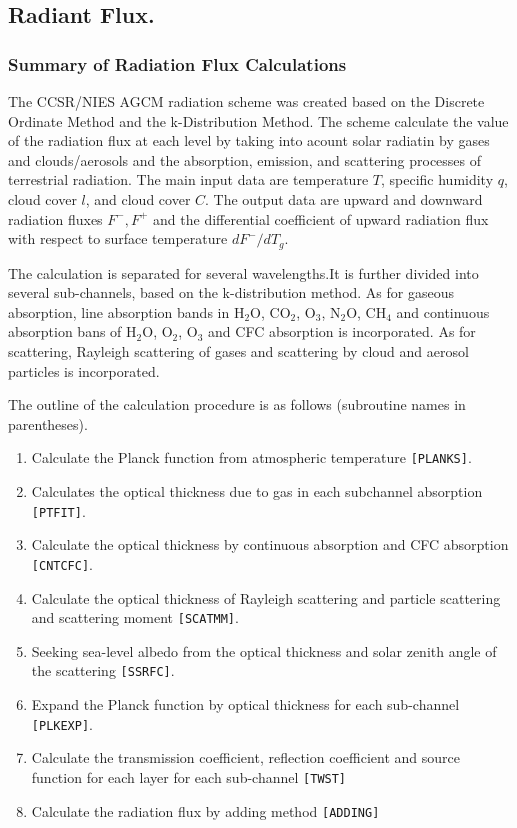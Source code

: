 \hypertarget{radiant-flux.}{%
\subsection{Radiant Flux.}\label{radiant-flux.}}
\hypertarget{summary-of-radiation-flux-calculations}{%
\subsubsection{Summary of Radiation Flux
Calculations}\label{summary-of-radiation-flux-calculations}}

The CCSR/NIES AGCM radiation scheme was created based on the Discrete 
Ordinate Method and the k-Distribution Method. The scheme calculate 
the value of the radiation flux at each level by taking into acount 
solar radiatin by gases and clouds/aerosols and the absorption, emission, 
and scattering processes of terrestrial radiation. The main input data are 
temperature \(T\), specific humidity \(q\), cloud cover \(l\), and cloud 
cover \(C\). The output data are upward and downward radiation fluxes \(F^-, F^+\) 
and the differential coefficient of upward radiation flux with respect to 
surface temperature \(dF^-/dT_g\).

The calculation is separated for several wavelengths.It is further divided 
into several sub-channels, based on the k-distribution method. As for gaseous 
absorption, line absorption bands in H\(_2\)O, CO\(_2\), O\(_3\), N\(_2\)O, CH\(_4\) 
and continuous absorption bans of H\(_2\)O, O\(_2\), O\(_3\) and CFC absorption is 
incorporated. As for scattering, Rayleigh scattering of gases and scattering by 
cloud and aerosol particles is incorporated.

The outline of the calculation procedure is as follows (subroutine names
in parentheses).

\begin{enumerate}
\def\labelenumi{\arabic{enumi}.}
\item
  Calculate the Planck function from atmospheric temperature
  \texttt{{[}PLANKS{]}}.
\item
  Calculates the optical thickness due to gas in each subchannel
  absorption \texttt{{[}PTFIT{]}}.
\item
  Calculate the optical thickness by continuous absorption and CFC absorption 
\texttt{{[}CNTCFC{]}}.
\item
   Calculate the optical thickness of Rayleigh scattering and particle scattering 
and scattering moment \texttt{{[}SCATMM{]}}.
\item
  Seeking sea-level albedo from the optical thickness and solar zenith angle of 
the scattering \texttt{{[}SSRFC{]}}.
\item
  Expand the Planck function by optical thickness for each sub-channel
  \texttt{{[}PLKEXP{]}}.
\item
  Calculate the transmission coefficient, reflection coefficient and source 
function for each layer for each sub-channel
  \texttt{{[}TWST{]}}
\item
  Calculate the radiation flux by adding method
  \texttt{{[}ADDING{]}}
\end{enumerate}

